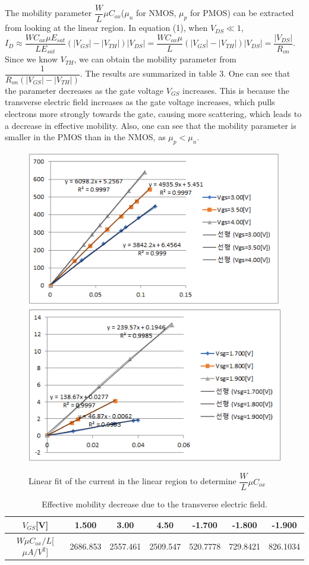 \documentclass[a4paper, itemph]{oblivoir}
\theoremstyle{definition}
\begin{document}
The mobility parameter $\dfrac{W}{L}\mu C_{ox}$($\mu_n$ for NMOS, $\mu_p$ for PMOS) can be extracted from looking at the linear region. In equation (1), when $V_{DS} \ll 1$, $I_D\approx \dfrac{WC_{ox}\mu E_{sat}}{LE_{sat}}(|V_{GS}|-|V_{TH}|)|V_{DS}|=\dfrac{WC_{ox}\mu}{L}(|V_{GS}|-|V_{TH}|)|V_{DS}|=\dfrac{|V_{DS}|}{R_{on}}$. Since we know $V_{TH}$, we can obtain the mobility parameter from $\dfrac{1}{R_{on}(|V_{GS}|-|V_{TH}|)}$. The results are summarized in table 3. One can see that the parameter decreases as the gate voltage $V_{GS}$ increases. This is because the transverse electric field increases as the gate voltage increases, which pulls electrons more strongly towards the gate, causing more scattering, which leads to a decrease in effective mobility. Also, one can see that the mobility parameter is smaller in the PMOS than in the NMOS, as $\mu_p < \mu_n$.
\begin{figure}[htb]
    \centering
    \includegraphics[width=0.4\linewidth]{Ron_nmos.png}
    \includegraphics[width=0.4\linewidth]{Ron_pmos.png}
    \caption{Linear fit of the current in the linear region to determine $\dfrac{W}{L}\mu C_{ox}$}
\end{figure}
\begin{table}[htb]
    \centering
    \begin{tabular}{c|c|c|c|c|c|c}
        $V_{GS}$[V] & 1.500 & 3.00 & 4.50 & -1.700 & -1.800 & -1.900 \\
        \hline
        $W\mu C_{ox}/L$[$\mu A/V^2$] & 2686.853 & 2557.461 & 2509.547 & 520.7778 & 729.8421 & 826.1034
    \end{tabular}
    \caption{Effective mobility decrease due to the transverse electric field.}
\end{table}
\end{document}
